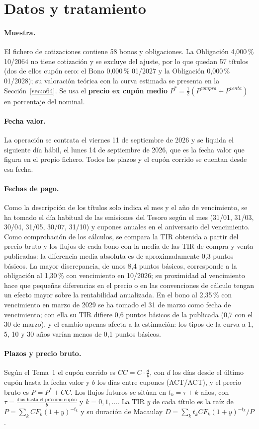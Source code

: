 \documentclass[a4paper,12pt]{article}
\begin{document}
\section{Datos y tratamiento}
\paragraph{Muestra.} El fichero de cotizaciones contiene 58 bonos y obligaciones. La Obligación 4,000\,\% 10/2064 no tiene cotización y se excluye del ajuste, por lo que quedan 57 títulos (dos de ellos cupón cero: el Bono 0,000\,\% 01/2027 y la Obligación 0,000\,\% 01/2028); su valoración teórica con la curva estimada se presenta en la Sección~\ref{sec:o64}. Se usa el \textbf{precio ex cupón medio} $P^*=\frac12(P^{compra}+P^{venta})$ en porcentaje del nominal.
\paragraph{Fecha valor.} La operación se contrata el viernes 11 de septiembre de 2026 y se liquida el siguiente día hábil, el lunes 14 de septiembre de 2026, que es la fecha valor que figura en el propio fichero. Todos los plazos y el cupón corrido se cuentan desde esa fecha.
\paragraph{Fechas de pago.} Como la descripción de los títulos solo indica el mes y el año de vencimiento, se ha tomado el día habitual de las emisiones del Tesoro según el mes (31/01, 31/03, 30/04, 31/05, 30/07, 31/10) y cupones anuales en el aniversario del vencimiento. Como comprobación de los cálculos, se compara la TIR obtenida a partir del precio bruto y los flujos de cada bono con la media de las TIR de compra y venta publicadas: la diferencia media absoluta es de aproximadamente 0{,}3 puntos básicos. La mayor discrepancia, de unos 8{,}4 puntos básicos, corresponde a la obligación al 1,30\,\% con vencimiento en 10/2026; su proximidad al vencimiento hace que pequeñas diferencias en el precio o en las convenciones de cálculo tengan un efecto mayor sobre la rentabilidad anualizada. En el bono al 2,35\,\% con vencimiento en marzo de 2029 se ha tomado el 31 de marzo como fecha de vencimiento; con ella su TIR difiere 0{,}6 puntos básicos de la publicada (0,7 con el 30 de marzo), y el cambio apenas afecta a la estimación: los tipos de la curva a 1, 5, 10 y 30 años varían menos de 0,1 puntos básicos.
\paragraph{Plazos y precio bruto.} Según el Tema~1 el cupón corrido es $CC=C\cdot\frac{d}{b}$, con $d$ los días desde el último cupón hasta la fecha valor y $b$ los días entre cupones (ACT/ACT), y el precio bruto es $P=P^*+CC$. Los flujos futuros se sitúan en $t_k=\tau+k$ años, con $\tau=\frac{\text{días hasta el próximo cupón}}{b}$ y $k=0,1,\dots$. La TIR $y$ de cada título es la raíz de $P=\sum_k CF_k(1+y)^{-t_k}$ y su duración de Macaulay $D=\sum_k t_kCF_k(1+y)^{-t_k}/P$.
\end{document}
